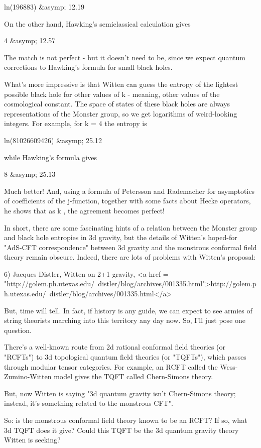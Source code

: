 ln(196883) &asymp; 12.19

On the other hand, Hawking's semiclassical calculation gives

4 \pi  &asymp; 12.57

The match is not perfect - but it doesn't need to be, since we 
expect quantum corrections to Hawking's formula for small black 
holes.

What's more impressive is that Witten can guess the entropy of
the lightest possible black hole for other values of k - meaning, 
other values of the cosmological constant.  The space of states
of these black holes are always representations of the Monster
group, so we get logarithms of weird-looking integers.  For 
example, for k = 4 the entropy is

ln(81026609426) &asymp; 25.12

while Hawking's formula gives

8 \pi  &asymp; 25.13

Much better!  And, using a formula of Petersson and Rademacher 
for asymptotics of coefficients of the j-function, together with 
some facts about Hecke operators, he shows that as k \to  \infty , 
the agreement becomes perfect!

In short, there are some fascinating hints of a relation between
the Monster group and black hole entropies in 3d gravity, but the
details of Witten's hoped-for "AdS-CFT correspondence" between 3d
gravity and the monstrous conformal field theory remain obscure.
Indeed, there are lots of problems with Witten's proposal:

6) Jacques Distler, Witten on 2+1 gravity,
<a href = "http://golem.ph.utexas.edu/~distler/blog/archives/001335.html">http://golem.ph.utexas.edu/~distler/blog/archives/001335.html</a>

But, time will tell.  In fact, if history is any guide, we can 
expect to see armies of string theorists marching into this 
territory any day now.  So, I'll just pose one question.  

There's a well-known route from 2d rational conformal field 
theories (or "RCFTs") to 3d topological quantum field theories
(or "TQFTs"), which passes through modular tensor categories. 
For example, an RCFT called the Wess-Zumino-Witten model gives 
the TQFT called Chern-Simons theory.  

But, now Witten is saying "3d quantum gravity isn't Chern-Simons theory;
instead, it's something related to the monstrous CFT".  

So: is the monstrous conformal field theory known to be an RCFT? 
If so, what 3d TQFT does it give?  Could this TQFT be the 3d 
quantum gravity theory Witten is seeking?  

